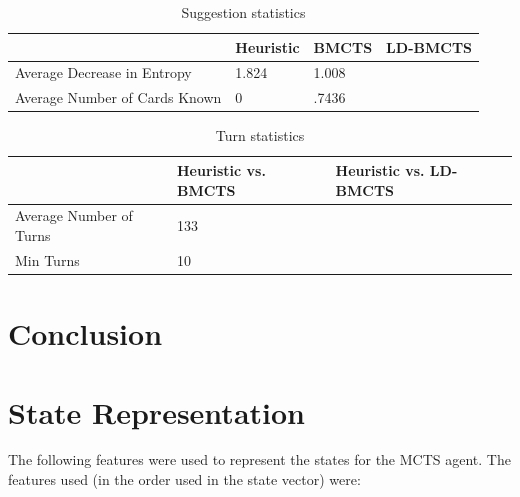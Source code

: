 \documentclass[msc, deptreport, ai, romanprepages]{infthesis}
\begin{document}
\begin{table}[h]
\centering
\caption{Suggestion statistics}
\begin{tabular}{l|lll}
& \multicolumn{1}{l|}{Heuristic} & \multicolumn{1}{l|}{BMCTS} & LD-BMCTS \\ \hline \hline
Average Decrease in Entropy & 1.824 & 1.008 & \\
Average Number of Cards Known & 0 & .7436 & \\
\end{tabular}
\end{table}

\begin{table}[h]
\centering
\caption{Turn statistics}
\begin{tabular}{l|ll}
& \multicolumn{1}{l|}{Heuristic vs. BMCTS} & \multicolumn{1}{l}{Heuristic vs. LD-BMCTS} \\ \hline \hline
Average Number of Turns & 133 & \\
Min Turns & 10 & 
\end{tabular}
\end{table}



\chapter{Conclusion}

\appendix
\chapter{State Representation}
The following features were used to represent the states for the MCTS agent. The features used (in the order used in the state vector) were:
\end{document}
